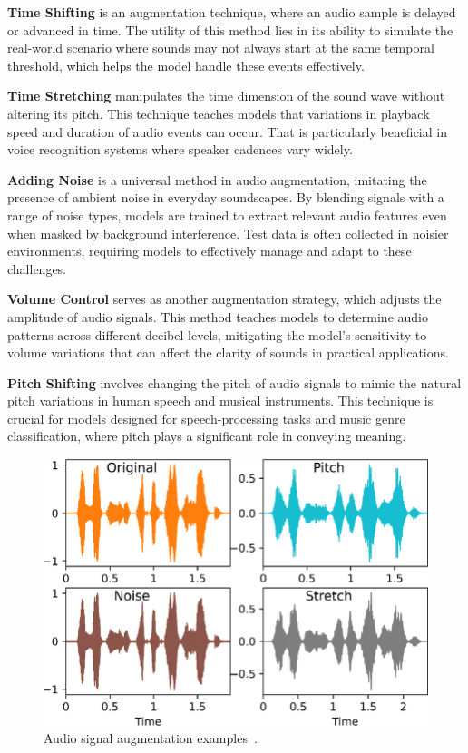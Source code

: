 \textbf{Time Shifting} is an augmentation technique, where an audio sample is delayed or advanced in time. The utility of this method lies in its ability to simulate the real-world scenario where sounds may not always start at the same temporal threshold, which helps the model handle these events effectively.

\textbf{Time Stretching} manipulates the time dimension of the sound wave without altering its pitch. This technique teaches models that variations in playback speed and duration of audio events can occur. That is particularly beneficial in voice recognition systems where speaker cadences vary widely.

\textbf{Adding Noise} is a universal method in audio augmentation, imitating the presence of ambient noise in everyday soundscapes. By blending signals with a range of noise types, models are trained to extract relevant audio features even when masked by background interference. Test data is often collected in noisier environments, requiring models to effectively manage and adapt to these challenges.

\textbf{Volume Control} serves as another augmentation strategy, which adjusts the amplitude of audio signals. This method teaches models to determine audio patterns across different decibel levels, mitigating the model's sensitivity to volume variations that can affect the clarity of sounds in practical applications.

\textbf{Pitch Shifting} involves changing the pitch of audio signals to mimic the natural pitch variations in human speech and musical instruments. This technique is crucial for models designed for speech-processing tasks and music genre classification, where pitch plays a significant role in conveying meaning.

\begin{figure}[!htb]
    \centering
    \includegraphics[scale=1.2]{Images/raw-audio-augmentations.png}
    \caption{Audio signal augmentation examples~\cite{RawAudioAugmentation}.}
    \label{fig:rawAudioAugmentation}
\end{figure}

